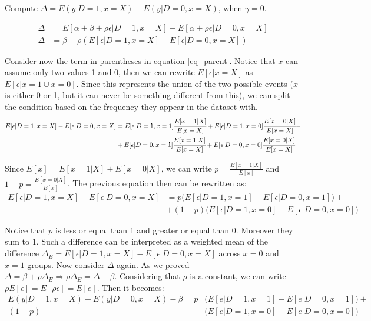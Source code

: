 \documentclass[a4paper,12pt,oneside,English]{article}
\begin{document}
Compute $\Delta=E(y|D = 1,x = X) - E(y|D = 0,x = X)$, when $\gamma=0$.

\begin{equation}
\label{eq_parent}
\begin{split}
    \Delta &= E[\alpha + \beta + \rho\epsilon | D=1, x=X] - E[\alpha + \rho\epsilon | D=0, x=X]\\
    \Delta &= \beta + \rho(E[\epsilon|D=1, x=X]-E[\epsilon|D=0, x=X])
\end{split}
\end{equation}

Consider now the term in parentheses in equation \eqref{eq_parent}. Notice that $x$ can assume only two values 1 and 0, then we can rewrite $E[\epsilon|x=X]$ as $E[\epsilon|x=1\cup x=0]$. Since this represents the union of the two possible events ($x$ is either 0 or 1, but it can never be something different from this), we can split the condition based on the frequency they appear in the dataset with.
\begin{equation}
\begin{split}
    E[\epsilon|D=1, x=X]-E[\epsilon|D=0, x=X]&=E[\epsilon|D=1, x=1]\cfrac{E[x=1|X]}{E[x=X]}+E[\epsilon|D=1, x=0]\cfrac{E[x=0|X]}{E[x=X]}-\\&+E[\epsilon|D=0, x=1]\cfrac{E[x=1|X]}{E[x=X]}+E[\epsilon|D=0, x=0]\cfrac{E[x=0|X]}{E[x=X]}
\end{split}
\end{equation}

Since $E[x]=E[x=1|X]+E[x=0|X]$, we can write $p=\frac{E[x=1|X]}{E[x]}$ and $1-p=\frac{E[x=0|X]}{E[x]}$. The previous equation then can be rewritten as:
\begin{equation}
    \begin{split}
    E[\epsilon|D=1, x=X]-E[\epsilon|D=0, x=X]&=p\Biggl(E[\epsilon|D=1, x=1]-E[\epsilon|D=0, x=1]\Biggr)+\\&+(1-p)\Biggl(E[\epsilon|D=1, x=0]-E[\epsilon|D=0, x=0]\Biggr)
\end{split}
\end{equation}

Notice that $p$ is less or equal than 1 and greater or equal than 0. Moreover they sum to 1. Such a difference can be interpreted as a weighted mean of the difference $\Delta_E=E[\epsilon|D=1, x=X]-E[\epsilon|D=0, x=X]$ across $x=0$ and $x=1$ groups. Now consider $\Delta$ again. As we proved $\Delta=\beta+\rho\Delta_E\Rightarrow\rho\Delta_E=\Delta-\beta$. Considering that $\rho$ is a constant, we can write $\rho E[\epsilon]=E[\rho\epsilon]=E[e]$. Then it becomes:
\begin{equation}
\begin{split}
        E(y|D = 1,x = X) - E(y|D = 0,x = X)-\beta
=p&\Biggl(E[e|D=1, x=1]-E[e|D=0, x=1]\Biggr)+\\(1-p)&\Biggl(E[e|D=1, x=0]-E[e|D=0, x=0]\Biggr)
\end{split}
\end{equation}
\end{document}

